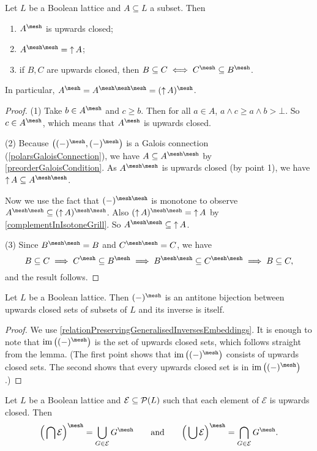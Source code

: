 \begin{lemma} \label{upwardClosureGrill}
Let $L$ be a Boolean lattice and $A \subseteq L$ a subset. Then
\begin{enumerate}
\item $A^\mesh$ is upwards closed;
\item $A^{\mesh\mesh} = \upset A$;
\item if $B,C$ are upwards closed, then $B\subseteq C \iff C^\mesh \subseteq B^\mesh$.
\end{enumerate}
\end{lemma}
In particular, $A^\mesh = A^{\mesh\mesh\mesh} = (\upset A)^\mesh$.
\begin{proof}
(1) Take $b\in A^\mesh$ and $c\geq b$. Then for all $a\in A$, $a\wedge c \geq a\wedge b > \bot$. So $c\in A^\mesh$, which means that $A^\mesh$ is upwards closed.

(2) Because $\big((-)^\mesh, (-)^\mesh\big)$ is a Galois connection (\ref{polarsGaloisConnection}), we have $A \subseteq A^{\mesh\mesh}$ by \ref{preorderGaloisCondition}. As $A^{\mesh\mesh}$ is upwards closed (by point 1), we have $\upset A \subseteq A^{\mesh\mesh}$.

Now we use the fact that $(-)^{\mesh\mesh}$ is monotone to observe $A^{\mesh\mesh} \subseteq (\upset A)^{\mesh\mesh}$. Also $(\upset A)^{\mesh\mesh} = \upset A$ by
\ref{complementInIsotoneGrill}. So $A^{\mesh\mesh} \subseteq \upset A$.

(3) Since $B^{\mesh\mesh} = B$ and $C^{\mesh\mesh} = C$, we have
\[B\subseteq C \implies C^\mesh \subseteq B^\mesh \implies B^{\mesh\mesh} \subseteq C^{\mesh\mesh} \implies B\subseteq C, \]
and the result follows.
\end{proof}
\begin{corollary} \label{grillUpsetOrderSimilarity}
Let $L$ be a Boolean lattice.
Then $(-)^\mesh$ is an antitone bijection between upwards closed sets of subsets of $L$ and its inverse is itself.
\end{corollary}
\begin{proof}
We use \ref{relationPreservingGeneralisedInversesEmbeddings}. It is enough to note that $\im\big((-)^\mesh\big)$ is the set of upwards closed sets, which follows straight from the lemma. (The first point shows that $\im\big((-)^\mesh\big)$ consists of upwards closed sets. The second shows that every upwards closed set is in $\im\big((-)^\mesh\big)$.)
\end{proof}
\begin{corollary} \label{grillIntersectionUnion}
Let $L$ be a Boolean lattice and $\mathcal{E}\subseteq\operatorname{\mathcal{P}}(L)$ such that each element of $\mathcal{E}$ is upwards closed. Then
\[ \Big(\bigcap\mathcal{E}\Big)^\mesh = \bigcup_{G\in\mathcal{E}}G^\mesh \qquad\text{and}\qquad \Big(\bigcup\mathcal{E}\Big)^\mesh = \bigcap_{G\in\mathcal{E}}G^\mesh. \]
\end{corollary}
